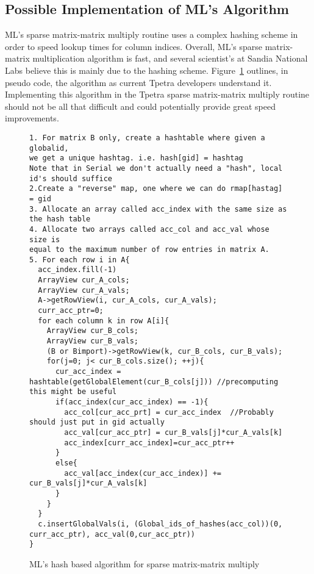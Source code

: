 \documentclass[pdf,12pt]{SANDreport}
\begin{document}
\subsection{Possible Implementation of ML's Algorithm}
ML's sparse matrix-matrix multiply routine uses a complex hashing scheme in order to speed lookup times for 
column indices. Overall, ML's sparse matrix-matrix multiplication algorithm is fast, and several scientist's at Sandia 
National Labs believe this is mainly due to the hashing scheme. Figure~\ref{hashalgo} outlines, in pseudo code, the 
algorithm as current Tpetra developers understand it. Implementing this algorithm in the Tpetra sparse matrix-matrix 
multiply routine should not be all that difficult and could potentially provide great speed improvements.

\begin{figure}
\centering
{\footnotesize
\begin{verbatim}
1. For matrix B only, create a hashtable where given a globalid, 
we get a unique hashtag. i.e. hash[gid] = hashtag
Note that in Serial we don't actually need a "hash", local id's should suffice
2.Create a "reverse" map, one where we can do rmap[hastag] = gid
3. Allocate an array called acc_index with the same size as the hash table
4. Allocate two arrays called acc_col and acc_val whose size is 
equal to the maximum number of row entries in matrix A.
5. For each row i in A{
  acc_index.fill(-1)
  ArrayView cur_A_cols;
  ArrayView cur_A_vals;
  A->getRowView(i, cur_A_cols, cur_A_vals);
  curr_acc_ptr=0;
  for each column k in row A[i]{
    ArrayView cur_B_cols;
    ArrayView cur_B_vals;
    (B or Bimport)->getRowView(k, cur_B_cols, cur_B_vals);
    for(j=0; j< cur_B_cols.size(); ++j){
      cur_acc_index = hashtable(getGlobalElement(cur_B_cols[j])) //precomputing this might be useful
      if(acc_index(cur_acc_index) == -1){
        acc_col[cur_acc_prt] = cur_acc_index  //Probably should just put in gid actually
        acc_val[cur_acc_ptr] = cur_B_vals[j]*cur_A_vals[k]
        acc_index[curr_acc_index]=cur_acc_ptr++
      }
      else{
        acc_val[acc_index(cur_acc_index)] += cur_B_vals[j]*cur_A_vals[k]
      }
    }
  }
  c.insertGlobalVals(i, (Global_ids_of_hashes(acc_col))(0, curr_acc_ptr), acc_val(0,cur_acc_ptr))
}

\end{verbatim}
}
\caption[Hash based algorithm]{ML's hash based algorithm for sparse matrix-matrix multiply}
\label{hashalgo}
\end{figure}
\end{document}
